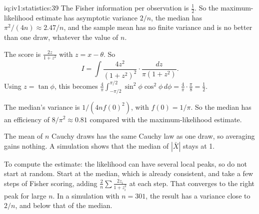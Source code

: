 \begin{solution}{iq:iv1:statistics:39}
The Fisher information per observation is $\tfrac12$. So the maximum-likelihood estimate has asymptotic variance $2/n$, the median has $\pi^2/(4n) \approx 2.47/n$, and the sample mean has no finite variance and is no better than one draw, whatever the value of $n$.

The score is $\frac{2z}{1 + z^2}$ with $z = x - \theta$. So
\[
I = \int \frac{4z^2}{(1 + z^2)^2} \cdot \frac{dz}{\pi(1 + z^2)}.
\]
Using $z = \tan\phi$, this becomes $\frac{4}{\pi}\int_{-\pi/2}^{\pi/2} \sin^2\phi\cos^2\phi\, d\phi = \frac{4}{\pi} \cdot \frac{\pi}{8} = \tfrac12$.

The median's variance is $1/(4nf(0)^2)$, with $f(0) = 1/\pi$. So the median has an efficiency of $8/\pi^2 \approx 0.81$ compared with the maximum-likelihood estimate.

The mean of $n$ Cauchy draws has the same Cauchy law as one draw, so averaging gains nothing. A simulation shows that the median of $|\bar{X}|$ stays at 1.

To compute the estimate: the likelihood can have several local peaks, so do not start at random. Start at the median, which is already consistent, and take a few steps of Fisher scoring, adding $\frac{2}{n}\sum \frac{2z_i}{1 + z_i^2}$ at each step. That converges to the right peak for large $n$. In a simulation with $n = 301$, the result has a variance close to $2/n$, and below that of the median.

\end{solution}

